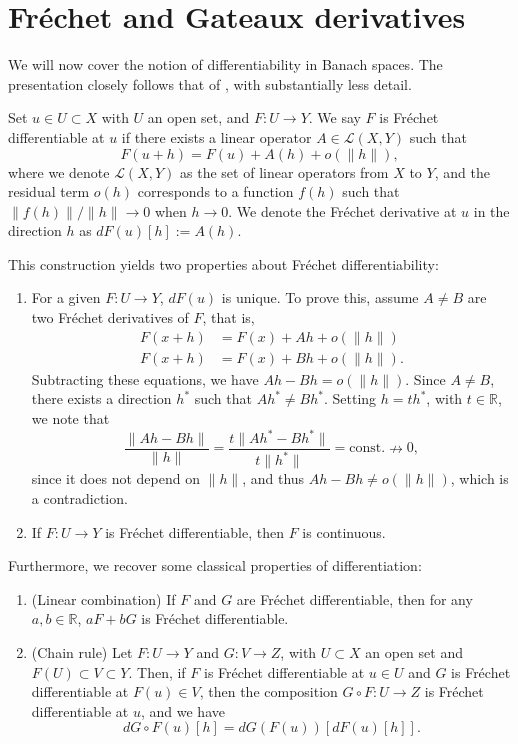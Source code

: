 \section{Fréchet and Gateaux derivatives}
We will now cover the notion of differentiability in Banach spaces. The presentation closely follows that of \cite{ambrosetti1995primer}, with substantially less detail.
\begin{definition}
    Set $u\in U \subset X$ with $U$ an open set, and $F:U\to Y$. We say $F$ is Fréchet differentiable at $u$ if there exists a linear operator $A\in\mathcal{L}(X,Y)$ such that
    \begin{equation*}
        F(u+h)=F(u)+A(h)+o(\|h\|),
    \end{equation*}
    where we denote $\mathcal{L}(X,Y)$ as the set of linear operators from $X$ to $Y$, and the residual term $o(h)$ corresponds to a function $f(h)$ such that $\|f(h)\|/\|h\| \to 0$ when $h\to 0$. We denote the Fréchet derivative at $u$ in the direction $h$ as $dF(u)[h] := A(h)$.
\end{definition}
This construction yields two properties about Fréchet differentiability:
\begin{enumerate}
    \item For a given $F:U\to Y$, $dF(u)$ is unique. To prove this, assume $A\neq B$ are two Fréchet derivatives of $F$, that is, 
    \begin{align*}
        F(x+h) &= F(x) + Ah + o(\|h\|) \\
        F(x+h) &= F(x) + Bh + o(\|h\|).
    \end{align*}
    Subtracting these equations, we have $Ah - Bh = o(\|h\|)$. Since $A\neq B$, there exists a direction $h^*$ such that $Ah^* \neq Bh^*$. Setting $h=th^*$, with $t\in \mathbb{R}$, we note that
    \begin{equation*}
        \frac{\|Ah-Bh\|}{\|h\|} = \frac{t\|Ah^*-Bh^*\|}{t\|h^*\|} = \text{const.} \nrightarrow 0,
    \end{equation*}
    since it does not depend on $\|h\|$, and thus $Ah - Bh \neq o(\|h\|)$, which is a contradiction. 
    \item If $F:U\to Y$ is Fréchet differentiable, then $F$ is continuous.
\end{enumerate}

Furthermore, we recover some classical properties of differentiation:
\begin{enumerate}
    \item (Linear combination) If $F$ and $G$ are Fréchet differentiable, then for any $a,b\in\mathbb{R}$, $aF+bG$ is Fréchet differentiable.
    \item (Chain rule) Let $F:U\to Y$ and $G:V\to Z$, with $U\subset X$ an open set and $F(U)\subset V\subset Y$. Then, if $F$ is Fréchet differentiable at $u\in U$ and $G$ is Fréchet differentiable at $F(u)\in V$, then the composition $G\circ F:U\to Z$ is Fréchet differentiable at $u$, and we have
        \begin{equation*}
            dG\circ F(u)[h] = dG(F(u))[dF(u)[h]].
        \end{equation*}
\end{enumerate}

